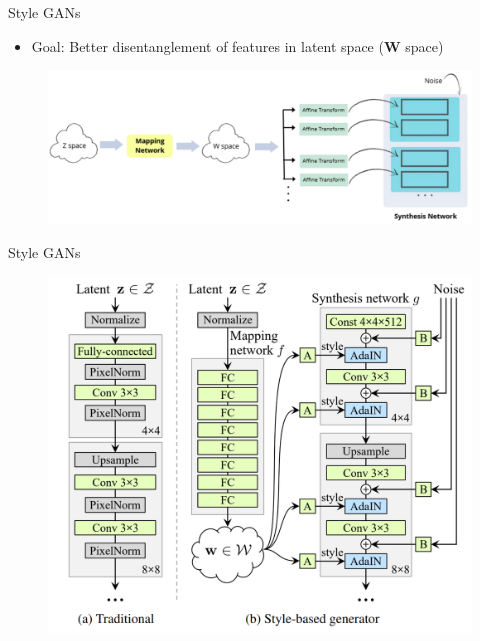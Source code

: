 \begin{frame}[allowframebreaks]{Style GANs}
\begin{itemize}
    \item Goal: Better disentanglement of features in latent space (\textbf{W} space)
\end{itemize}
    \begin{figure}
    \centering
    \includegraphics[height=0.9\textheight, width=\textwidth, keepaspectratio]{images/gan/stylegan_2.png}
\end{figure}

\end{frame}
\begin{frame}[allowframebreaks]{Style GANs}
\begin{figure}
    \centering
    \includegraphics[height=0.9\textheight, width=\textwidth, keepaspectratio]{images/gan/stylegan_1.png}
\end{figure}
\end{frame}
